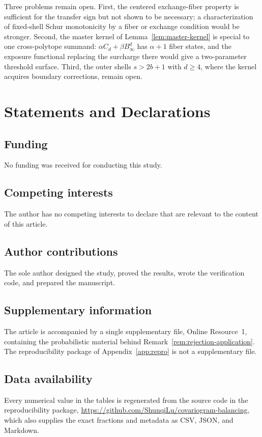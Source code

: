 \documentclass[pdflatex,sn-mathphys-num]{sn-jnl}
\theoremstyle{thmstyleone}
\theoremstyle{thmstylethree}
\theoremstyle{thmstyletwo}
\begin{document}
Three problems remain open.  First, the centered exchange-fiber property is
sufficient for the transfer sign but not shown to be necessary; a
characterization of fixed-shell Schur monotonicity by a fiber or exchange
condition would be stronger.  Second, the master kernel of
Lemma~\ref{lem:master-kernel} is special to one cross-polytope summand:
$\alpha C_d+\beta B_\infty^d$ has $\alpha+1$ fiber states, and the exposure
functional replacing the surcharge there would give a two-parameter threshold
surface.  Third, the outer shells $s>2b+1$ with $d\ge4$, where the kernel
acquires boundary corrections, remain open.


\backmatter

\section*{Statements and Declarations}

\subsection*{Funding}
No funding was received for conducting this study.

\subsection*{Competing interests}
The author has no competing interests to declare that are relevant to the
content of this article.

\subsection*{Author contributions}
The sole author designed the study, proved the results, wrote the verification
code, and prepared the manuscript.

\subsection*{Supplementary information}
The article is accompanied by a single supplementary file, Online
Resource~1, containing the probabilistic material behind
Remark~\ref{rem:rejection-application}.  The reproducibility package of
Appendix~\ref{app:repro} is not a supplementary file.

\subsection*{Data availability}
Every numerical value in the tables is regenerated from the source code in the
reproducibility package,
\url{https://github.com/ShunqiLu/covariogram-balancing}, which also supplies
the exact fractions and metadata as CSV, JSON, and Markdown.
\end{document}

